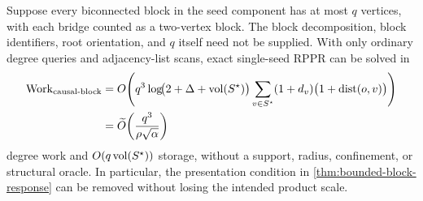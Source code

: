 \begin{theorem}
\label{thm:causal-bounded-block-response}
Suppose every biconnected block in the seed component has at most $q$
vertices, with each bridge counted as a two-vertex block.  The block
decomposition, block identifiers, root orientation, and $q$ itself need not
be supplied.  With only ordinary degree queries and adjacency-list scans,
exact single-seed RPPR can be solved in
\begin{align}
 \operatorname{Work}_{\rm causal\text{-}block}
 &=O\!\left(
   q^3\log\!\bigl(2+\Delta+\operatorname{vol}(S^\star)\bigr)
   \sum_{v\in S^\star}
    (1+d_v)\bigl(1+\operatorname{dist}(o,v)\bigr)
  \right)\notag\\
 &=\widetilde O\!\left(
   \frac{q^3}{\rho\sqrt\alpha}
  \right)
 \label{eq:causal-bounded-block-work}
\end{align}
degree work and $O(q\operatorname{vol}(S^\star))$ storage, without a support, radius,
confinement, or structural oracle.  In particular, the presentation
condition in \cref{thm:bounded-block-response} can be removed without losing
the intended product scale.
\end{theorem}


